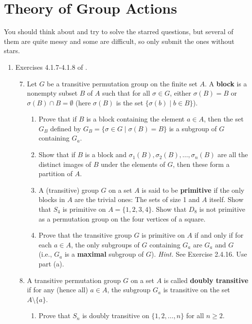 \documentclass[../psets.tex]{subfiles}
\begin{document}
\section{Theory of Group Actions}
You should think about and try to solve the starred questions, but several of them are quite messy and some are difficult, so only submit the ones without stars.
\begin{enumerate}
    \item Exercises 4.1.7-4.1.8 of \textcite{bib:DummitFoote}.
    \begin{enumerate}[label={\textbf{\arabic*.}}]
        \setcounter{enumii}{6}
        \item Let $G$ be a transitive permutation group on the finite set $A$. A \textbf{block} is a nonempty subset $B$ of $A$ such that for all $\sigma\in G$, either $\sigma(B)=B$ or $\sigma(B)\cap B=\emptyset$ (here $\sigma(B)$ is the set $\{\sigma(b)\mid b\in B\}$).
        \begin{enumerate}[label={\textbf{(\alph*)}}]
            \item Prove that if $B$ is a block containing the element $a\in A$, then the set $G_B$ defined by $G_B=\{\sigma\in G\mid\sigma(B)=B\}$ is a subgroup of $G$ containing $G_a$.
            \item Show that if $B$ is a block and $\sigma_1(B),\sigma_2(B),\dots,\sigma_n(B)$ are all the distinct images of $B$ under the elements of $G$, then these form a partition of $A$.
            \item A (transitive) group $G$ on a set $A$ is said to be \textbf{primitive} if the only blocks in $A$ are the trivial ones: The sets of size 1 and $A$ itself. Show that $S_4$ is primitive on $A=\{1,2,3,4\}$. Show that $D_8$ is not primitive as a permutation group on the four vertices of a square.
            \item Prove that the transitive group $G$ is primitive on $A$ if and only if for each $a\in A$, the only subgroups of $G$ containing $G_a$ are $G_a$ and $G$ (i.e., $G_a$ is a \textbf{maximal} subgroup of $G$). \emph{Hint.} See Exercise 2.4.16. Use part (a).
        \end{enumerate}
        \item A transitive permutation group $G$ on a set $A$ is called \textbf{doubly transitive} if for any (hence all) $a\in A$, the subgroup $G_a$ is transitive on the set $A\setminus\{a\}$.
        \begin{enumerate}[label={\textbf{(\alph*)}}]
            \item Prove that $S_n$ is doubly transitive on $\{1,2,\dots,n\}$ for all $n\geq 2$.

\end{enumerate}
\end{enumerate}
\end{enumerate}
\end{document}
